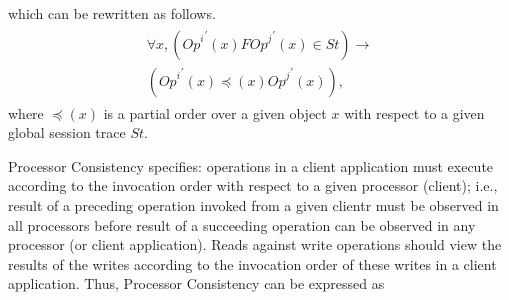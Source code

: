 \documentclass{sig-alternate-05-2015}
\begin{document}
  which can be rewritten as follows. 
  \begin{align}\label{eqn:TSO}
\begin{split}
\forall x, \left( {\mathit{Op}^i}^{'}(x) F {\mathit{Op}^j}^{'} (x) \in \mathit{St} \right) \rightarrow \\ \left( {\mathit{Op}^i}^{'}(x) \preccurlyeq(x) {\mathit{Op}^j}^{'} (x) \right),
\end{split}
  \end{align}  where $ \preccurlyeq(x)$ is a partial order over a given object $x$ with respect to a given global session trace $ \mathit{St}$.
 \par Processor Consistency specifies: operations in a client application must execute according to the invocation order with respect to a given processor (client); i.e., result of a preceding operation invoked from a given clientr must be observed in all processors before result of a
 succeeding operation can be observed in any processor (or client application). Reads against  write operations should
  view the results of the writes
  according to the invocation order of these writes in a client application. %
  Thus, Processor Consistency can be expressed as 
\end{document}

